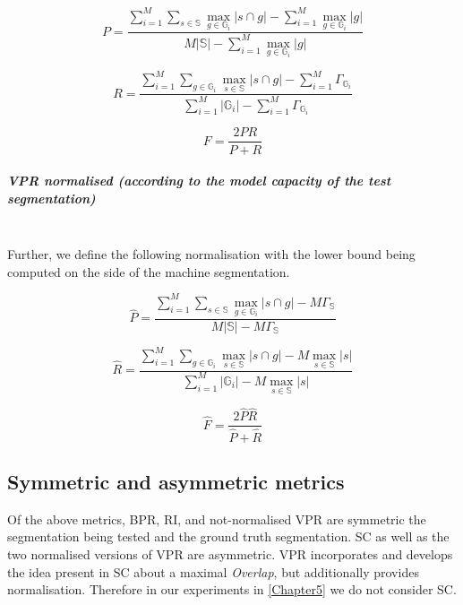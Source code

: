 \begin{equation}
P=\frac{\sum\limits _{i=1}^{M}\sum\limits _{s\in\mathbb{S}}\max\limits _{g\in\mathbb{G}_{i}}\left|s\cap g\right|-\boxed{\sum\limits _{i=1}^{M}\max\limits _{g\in\mathbb{G}_{i}}\left|g\right|}}{M\left|\mathbb{S}\right|-\boxed{\sum\limits _{i=1}^{M}\max\limits _{g\in\mathbb{G}_{i}}\left|g\right|}}
\end{equation}

\begin{equation}
R=\frac{\sum\limits _{i=1}^{M}\sum\limits _{g\in\mathbb{G}_{i}}\max\limits _{s\in\mathbb{S}}\left|s\cap g\right|-\boxed{\sum\limits _{i=1}^{M}\Gamma_{\mathbb{G}_{i}}}}{\sum\limits _{i=1}^{M}\left|\mathbb{G}_{i}\right|-\boxed{\sum\limits _{i=1}^{M}\Gamma_{\mathbb{G}_{i}}}}
\end{equation}

\begin{equation}
F=\frac{2PR}{P+R}
\end{equation}

\subparagraph{VPR normalised (according to the model capacity of the test segmentation)}\mbox{}\\ %
Further, we define the following normalisation with the lower bound being computed on the side of the machine segmentation.

\begin{equation}
\hat{P}=\frac{\sum\limits _{i=1}^{M}\sum\limits _{s\in\mathbb{S}}\max\limits _{g\in\mathbb{G}_{i}}\left|s\cap g\right|-\boxed{M\Gamma_{\mathbb{S}}}}{M\left|\mathbb{S}\right|-\boxed{M\Gamma_{\mathbb{S}}}}
\end{equation}

\begin{equation}
\hat{{R}}=\frac{\sum\limits _{i=1}^{M}\sum\limits _{g\in\mathbb{G}_{i}}\max\limits _{s\in\mathbb{S}}\left|s\cap g\right|-\boxed{M\max_{s\in\mathbb{S}}\left|s\right|}}{\sum\limits _{i=1}^{M}\left|\mathbb{G}_{i}\right|-\boxed{M\max_{s\in\mathbb{S}}\left|s\right|}}
\end{equation}

\begin{equation}
\hat{{F}}=\frac{2\hat{P}\hat{R}}{\hat{P}+\hat{R}}
\end{equation}

\subsection{Symmetric and asymmetric metrics}
Of the above metrics, BPR, RI, and not-normalised VPR are symmetric \wrt the segmentation being tested %
and the ground truth segmentation. SC as well as the two normalised versions of VPR are asymmetric. VPR incorporates and develops the idea present in SC about a maximal \textit{Overlap}, but additionally provides normalisation. Therefore in our experiments in \cref{Chapter5} we do not consider SC.

